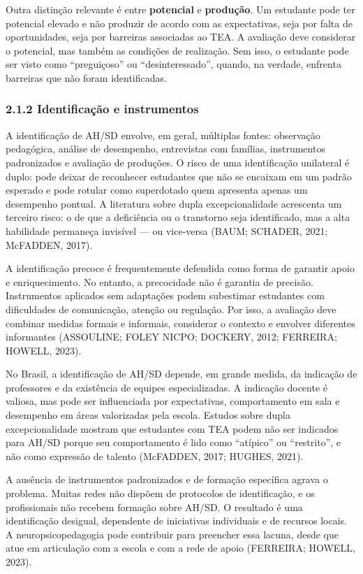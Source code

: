 Outra distinção relevante é entre \textbf{potencial} e
\textbf{produção}. Um estudante pode ter potencial elevado e não
produzir de acordo com as expectativas, seja por falta de oportunidades,
seja por barreiras associadas ao TEA. A avaliação deve considerar o
potencial, mas também as condições de realização. Sem isso, o estudante
pode ser visto como ``preguiçoso'' ou ``desinteressado'', quando, na
verdade, enfrenta barreiras que não foram identificadas.

\subsubsection{2.1.2 Identificação e
instrumentos}\label{identificauxe7uxe3o-e-instrumentos}

A identificação de AH/SD envolve, em geral, múltiplas fontes: observação
pedagógica, análise de desempenho, entrevistas com famílias,
instrumentos padronizados e avaliação de produções. O risco de uma
identificação unilateral é duplo: pode deixar de reconhecer estudantes
que não se encaixam em um padrão esperado e pode rotular como
superdotado quem apresenta apenas um desempenho pontual. A literatura
sobre dupla excepcionalidade acrescenta um terceiro risco: o de que a
deficiência ou o transtorno seja identificado, mas a alta habilidade
permaneça invisível --- ou vice-versa (BAUM; SCHADER, 2021; McFADDEN,
2017).

A identificação precoce é frequentemente defendida como forma de
garantir apoio e enriquecimento. No entanto, a precocidade não é
garantia de precisão. Instrumentos aplicados sem adaptações podem
subestimar estudantes com dificuldades de comunicação, atenção ou
regulação. Por isso, a avaliação deve combinar medidas formais e
informais, considerar o contexto e envolver diferentes informantes
(ASSOULINE; FOLEY NICPO; DOCKERY, 2012; FERREIRA; HOWELL, 2023).

No Brasil, a identificação de AH/SD depende, em grande medida, da
indicação de professores e da existência de equipes especializadas. A
indicação docente é valiosa, mas pode ser influenciada por expectativas,
comportamento em sala e desempenho em áreas valorizadas pela escola.
Estudos sobre dupla excepcionalidade mostram que estudantes com TEA
podem não ser indicados para AH/SD porque seu comportamento é lido como
``atípico'' ou ``restrito'', e não como expressão de talento (McFADDEN,
2017; HUGHES, 2021).

A ausência de instrumentos padronizados e de formação específica agrava
o problema. Muitas redes não dispõem de protocolos de identificação, e
os profissionais não recebem formação sobre AH/SD. O resultado é uma
identificação desigual, dependente de iniciativas individuais e de
recursos locais. A neuropsicopedagogia pode contribuir para preencher
essa lacuna, desde que atue em articulação com a escola e com a rede de
apoio (FERREIRA; HOWELL, 2023).

